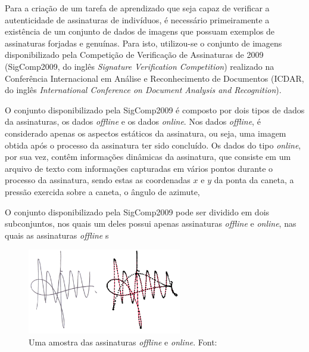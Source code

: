 Para a criação de um tarefa de aprendizado que seja capaz de verificar a autenticidade de assinaturas de indivíduos, é necessário primeiramente a existência de um conjunto de dados de imagens que possuam exemplos de assinaturas forjadas e genuínas. Para isto, utilizou-se o conjunto de imagens disponibilizado pela Competição de Verificação de Assinaturas de 2009 (SigComp2009, do inglês \emph{Signature Verification Competition}) realizado na Conferência Internacional em Análise e Reconhecimento de Documentos (ICDAR, do inglês \emph{International Conference on Document Analysis and Recognition}).

O conjunto disponibilizado pela SigComp2009 é composto por dois tipos de dados da assinaturas, os dados \emph{offline} e os dados \emph{online}. Nos dados \emph{offline}, é considerado apenas os aspectos estáticos da assinatura, ou seja, uma imagem obtida após o processo da assinatura ter sido concluído. Os dados do tipo \emph{online}, por sua vez, contêm informações dinâmicas da assinatura, que consiste em um arquivo de texto com informações capturadas em vários pontos durante o processo da assinatura, sendo estas as coordenadas $x$ e $y$ da ponta da caneta, a pressão exercida sobre a caneta, o ângulo de azimute,

O conjunto disponibilizado pela SigComp2009 pode ser dividido em dois subconjuntos, nos quais um deles possui apenas assinaturas \emph{offline} e \emph{online}, nas quais as assinaturas \emph{offline} s

\begin{figure}[h!]
\centering
\caption{Uma amostra das assinaturas \emph{offline} e \emph{online}. Font: \cite{icdar2009}}
\label{fig:sample-signature}
\includegraphics[width=0.6\textwidth]{imgs/sample-signature}
\end{figure}


